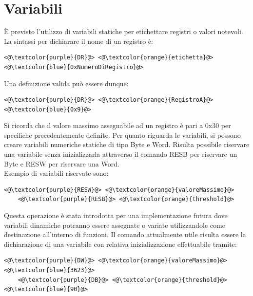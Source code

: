 \section{Variabili}
È previsto l'utilizzo di variabili statiche per etichettare registri o valori notevoli.
La sintassi per dichiarare il nome di un registro è:
\begin{lstlisting}[numbers=none]
    <@\textcolor{purple}{DR}@> <@\textcolor{orange}{etichetta}@> <@\textcolor{blue}{0xNumeroDiRegistro}@>
\end{lstlisting}
Una definizione valida può essere dunque:
\begin{lstlisting}[numbers=none]
    <@\textcolor{purple}{DR}@> <@\textcolor{orange}{RegistroA}@> <@\textcolor{blue}{0x9}@>
\end{lstlisting}
Si ricorda che il valore massimo assegnabile ad un registro è pari a 0x30 per specifiche precedentemente definite.
Per quanto riguarda le variabili, si possono creare variabili numeriche statiche di tipo Byte e Word.
Risulta possibile riservare una variabile senza inizializzarla attraverso il comando RESB per riservare un Byte  e RESW per riservare una Word.
\\Esempio di variabili riservate sono:
\begin{lstlisting}[numbers=none]
    <@\textcolor{purple}{RESW}@> <@\textcolor{orange}{valoreMassimo}@>
    <@\textcolor{purple}{RESB}@> <@\textcolor{orange}{threshold}@>
\end{lstlisting}
Questa operazione è stata introdotta per una implementazione futura dove variabili dinamiche potranno essere assegnate o variate utilizzandole come destinazione all'interno di funzioni.
Il comando attualmente utile risulta essere la dichiarazione di una variabile con relativa inizializzazione effettuabile tramite:
\begin{lstlisting}[numbers=none]
    <@\textcolor{purple}{DW}@> <@\textcolor{orange}{valoreMassimo}@> <@\textcolor{blue}{3623}@>
    <@\textcolor{purple}{DB}@> <@\textcolor{orange}{threshold}@> <@\textcolor{blue}{90}@>
\end{lstlisting}


